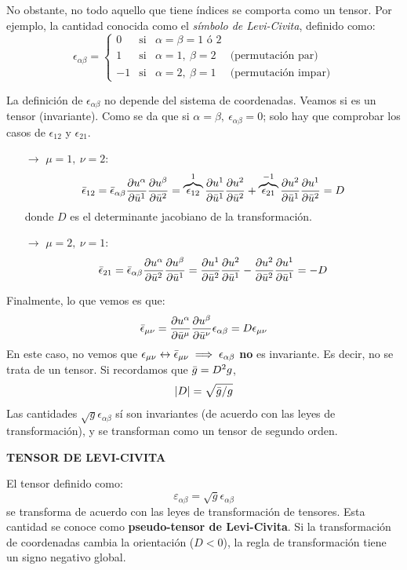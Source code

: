 No obstante, no todo aquello que tiene índices se comporta como un tensor. Por ejemplo, la cantidad conocida como el \emph{símbolo de Levi-Civita}, definido como:
$$
\epsilon_{\alpha \beta}=\left \{ 
\begin{array}{cccc}
     0&\text{si}&\alpha =\beta=1 \text{ ó } 2 & \\
     1&\text{si}&\alpha =1,\ \beta=2& \text{(permutación par)}  \\
     -1&\text{si}&\alpha =2,\ \beta=1& \text{(permutación impar)}
\end{array}
\right .
$$

La definición de $\epsilon_{\alpha \beta}$ no depende del sistema de coordenadas. Veamos si es un tensor (invariante). Como se da que si $\alpha =\beta ,\ \epsilon_{\alpha \beta}=0$; solo hay que comprobar los casos de $\epsilon _{12}$ y $\epsilon_{21}$.
\begin{itemize}
    \item[$\rightarrow$] $\mu =1,\ \nu=2$:
    $$
    \Bar{\epsilon}_{12}=\Bar{\epsilon }_{\alpha \beta }\pdv{u^\alpha }{\Bar{u}^1}\pdv{u^\beta }{\Bar{u}^2}=\overbrace{\epsilon_{12}}^{1}\pdv{u^1 }{\Bar{u}^1}\pdv{u^2 }{\Bar{u}^2}+\overbrace{\epsilon_{21}}^{-1}\pdv{u^2 }{\Bar{u}^1}\pdv{u^1 }{\Bar{u}^2}=D
    $$
    donde $D$ es el determinante jacobiano de la transformación.

    \item[$\rightarrow $]$\mu=2,\ \nu=1$:
    $$
    \Bar{\epsilon }_{21}=\Bar{\epsilon }_{\alpha \beta }\pdv{u^\alpha }{\Bar{u}^2}\pdv{u^\beta }{\Bar{u}^1}=\pdv{u^1 }{\Bar{u}^2}\pdv{u^2 }{\Bar{u}^1}-\pdv{u^2 }{\Bar{u}^2}\pdv{u^1 }{\Bar{u}^1}=-D
    $$
\end{itemize}

Finalmente, lo que vemos es que:
$$
\Bar{\epsilon }_{\mu \nu}=\pdv{u^\alpha }{\Bar{u}^\mu }\pdv{u^\beta }{\Bar{u}^\nu}\epsilon_{\alpha \beta}=D\epsilon_{\mu \nu}
$$
En este caso, no vemos que $\epsilon_{\mu \nu}\leftrightarrow\Bar{\epsilon }_{\mu \nu}\implies \epsilon_{\alpha \beta }$ \textbf{no} es invariante. Es decir, no se trata de un tensor. Si recordamos que $\Bar{g}=D^2g$,
$$
|D|=\sqrt{\Bar{g}/g}
$$
Las cantidades $\sqrt{g}\epsilon_{\alpha \beta}$ sí son invariantes (de acuerdo con las leyes de transformación), y se transforman como un tensor de segundo orden.
\begin{mybox}
    \begin{center}
        \textbf{TENSOR DE LEVI-CIVITA}
    \end{center}
    El tensor definido como:
    $$
    \varepsilon_{\alpha \beta }=\sqrt{g}\epsilon_{\alpha \beta}
    $$
    se transforma de acuerdo con las leyes de transformación de tensores. Esta cantidad se conoce como \textbf{pseudo-tensor de Levi-Civita}. Si la transformación de coordenadas cambia la orientación ($D<0$), la regla de transformación tiene un signo negativo global.
\end{mybox}

